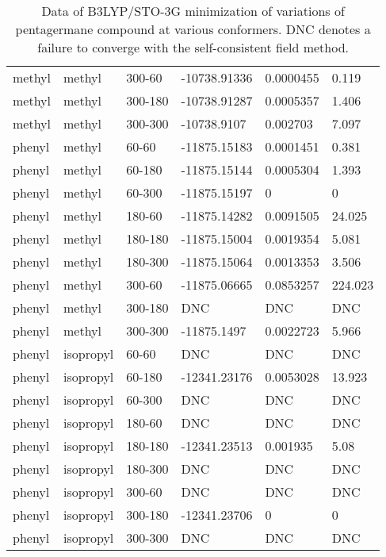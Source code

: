 \begin{table}[]
\begin{tabular}{llllll}
		methyl & methyl & 300-60 & -10738.91336 & 0.0000455 & 0.119 \\
		methyl & methyl & 300-180 & -10738.91287 & 0.0005357 & 1.406 \\
		methyl & methyl & 300-300 & -10738.9107 & 0.002703 & 7.097 \\ \hline
		phenyl & methyl & 60-60 & -11875.15183 & 0.0001451 & 0.381 \\
		phenyl & methyl & 60-180 & -11875.15144 & 0.0005304 & 1.393 \\
		phenyl & methyl & 60-300 & -11875.15197 & 0 & 0 \\
		phenyl & methyl & 180-60 & -11875.14282 & 0.0091505 & 24.025 \\
		phenyl & methyl & 180-180 & -11875.15004 & 0.0019354 & 5.081 \\
		phenyl & methyl & 180-300 & -11875.15064 & 0.0013353 & 3.506 \\
		phenyl & methyl & 300-60 & -11875.06665 & 0.0853257 & 224.023 \\
		phenyl & methyl & 300-180 & DNC & DNC & DNC \\
		phenyl & methyl & 300-300 & -11875.1497 & 0.0022723 & 5.966 \\ \hline
		phenyl & isopropyl & 60-60 & DNC & DNC & DNC \\
		phenyl & isopropyl & 60-180 & -12341.23176 & 0.0053028 & 13.923 \\
		phenyl & isopropyl & 60-300 & DNC & DNC & DNC \\
		phenyl & isopropyl & 180-60 & DNC & DNC & DNC \\
		phenyl & isopropyl & 180-180 & -12341.23513 & 0.001935 & 5.08 \\
		phenyl & isopropyl & 180-300 & DNC & DNC & DNC \\
		phenyl & isopropyl & 300-60 & DNC & DNC & DNC \\
		phenyl & isopropyl & 300-180 & -12341.23706 & 0 & 0 \\
		phenyl & isopropyl & 300-300 & DNC & DNC & DNC
	\end{tabular}
	\caption{Data of B3LYP/STO-3G minimization of variations of pentagermane compound at various conformers. DNC denotes a failure to converge with the self-consistent field method.}
	\label{tab:Ge5Ver2Data}
\end{table}

